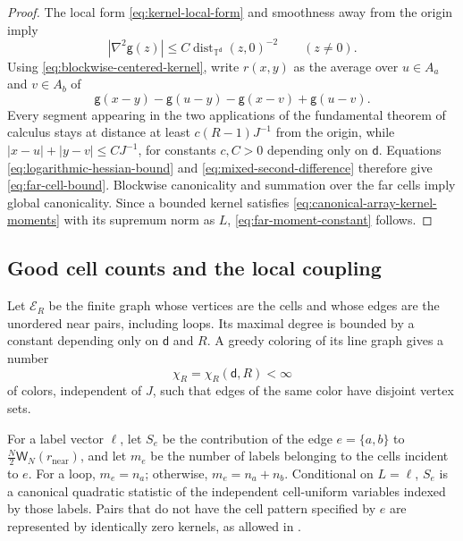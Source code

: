 \documentclass[11pt,reqno]{amsart}
\numberwithin{equation}{section}
\theoremstyle{plain}
\theoremstyle{definition}
\renewcommand{\d}{\mathsf d}
\newcommand{\T}{\mathbb T}
\newcommand{\g}{\mathsf g}
\begin{document}
\begin{proof}
The local form \eqref{eq:kernel-local-form} and smoothness away from the origin imply
\begin{equation}
 |\nabla^2\g(z)|
 \leq C\operatorname{dist}_{\T^{\d}}(z,0)^{-2}
 \qquad(z\neq0).
 \label{eq:logarithmic-hessian-bound}
\end{equation}
Using \eqref{eq:blockwise-centered-kernel}, write $r(x,y)$ as the average over $u\in A_a$ and $v\in A_b$ of
\begin{equation}
 \g(x-y)-\g(u-y)-\g(x-v)+\g(u-v).
 \label{eq:mixed-second-difference}
\end{equation}
Every segment appearing in the two applications of the fundamental theorem of calculus stays at distance at least $c(R-1)J^{-1}$ from the origin, while $|x-u|+|y-v|\leq CJ^{-1}$, for constants $c,C>0$ depending only on $\d$.  Equations \eqref{eq:logarithmic-hessian-bound} and \eqref{eq:mixed-second-difference} therefore give \eqref{eq:far-cell-bound}.  Blockwise canonicality and summation over the far cells imply global canonicality.  Since a bounded kernel satisfies \eqref{eq:canonical-array-kernel-moments} with its supremum norm as $L$, \eqref{eq:far-moment-constant} follows.
\end{proof}

\subsection{Good cell counts and the local coupling}
\label{subsec:good-occupancies}

Let $\mathcal E_R$ be the finite graph whose vertices are the cells and whose edges are the unordered near pairs, including loops.  Its maximal degree is bounded by a constant depending only on $\d$ and $R$.  A greedy coloring of its line graph gives a number
\begin{equation}
 \chi_R=\chi_R(\d,R)<\infty
 \label{eq:near-edge-color-number}
\end{equation}
of colors, independent of $J$, such that edges of the same color have disjoint vertex sets.

For a label vector $\ell$, let $S_e$ be the contribution of the edge $e=\{a,b\}$ to $\frac N2\mathsf W_N(r_{\mathrm{near}})$, and let $m_e$ be the number of labels belonging to the cells incident to $e$.  For a loop, $m_e=n_a$; otherwise, $m_e=n_a+n_b$.  Conditional on $L=\ell$, $S_e$ is a canonical quadratic statistic of the independent cell-uniform variables indexed by those labels.  Pairs that do not have the cell pattern specified by $e$ are represented by identically zero kernels, as allowed in .
\end{document}
